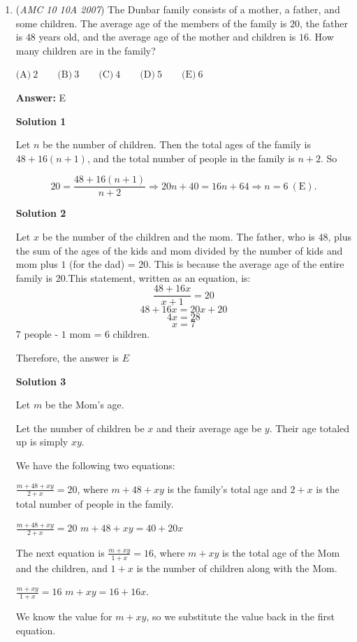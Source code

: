 \begin{enumerate}
	\item (\textit{AMC 10 10A 2007}) The Dunbar family consists of a mother, a father, and some children. The average age of the members of the family is $20$, the father is $48$ years old, and the average age of the mother and children is $16$. How many children are in the family?


 $\text{(A)}\ 2 \qquad \text{(B)}\ 3 \qquad \text{(C)}\ 4 \qquad \text{(D)}\ 5 \qquad \text{(E)}\ 6$

 \textbf{Answer: }E



\textbf{Solution 1}

Let $n$ be the number of children. Then the total ages of the family is $48 + 16(n+1)$, and the total number of people in the family is $n+2$. So

 
 \[20 = \frac{48 + 16(n+1)}{n+2} \Longrightarrow 20n + 40 = 16n + 64 \Longrightarrow n = 6\ \mathrm{(E)}.\]




\textbf{Solution 2}

Let $x$ be the number of the children and the mom. The father, who is $48$, plus the sum of the ages of the kids and mom divided by the number of kids and mom plus $1$ (for the dad) = $20$. This is because the average age of the entire family is $20.$This statement, written as an equation, is: 
 \[\frac{48+16x}{x+1}=20\]
 \[48+16x=20x+20\]
 \[4x=28\]
 \[x=7\]
$7$ people - $1$ mom = $6$ children.

 Therefore, the answer is $\boxed{E}$




\textbf{Solution 3}

Let $m$ be the Mom's age.

 Let the number of children be $x$ and their average age be $y$. Their age totaled up is simply $xy$. 

 We have the following two equations:

 $\frac{m+48+xy}{2+x}=20$, where $m+48+xy$ is the family's total age and $2+x$ is the total number of people in the family.

 $\frac{m+48+xy}{2+x}=20$
$m+48+xy=40+20x$

 The next equation is $\frac{m+xy}{1+x}=16$, where $m+xy$ is the total age of the Mom and the children, and $1+x$ is the number of children along with the Mom.

 $\frac{m+xy}{1+x}=16$
$m+xy=16+16x$.

 We know the value for $m+xy$, so we substitute the value back in the first equation.


\end{enumerate}
